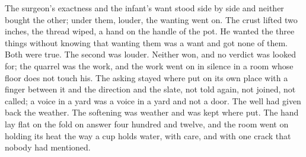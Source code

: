 The surgeon's exactness and the infant's want stood side by side and neither bought the other; under them, louder, the wanting went on. The crust lifted two inches, the thread wiped, a hand on the handle of the pot. He wanted the three things without knowing that wanting them was a want and got none of them. Both were true. The second was louder. Neither won, and no verdict was looked for; the quarrel was the work, and the work went on in silence in a room whose floor does not touch his. The asking stayed where put on its own place with a finger between it and the direction and the slate, not told again, not joined, not called; a voice in a yard was a voice in a yard and not a door. The well had given back the weather. The softening was weather and was kept where put. The hand lay flat on the fold on answer four hundred and twelve, and the room went on holding its heat the way a cup holds water, with care, and with one crack that nobody had mentioned.
